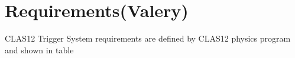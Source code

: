 \section{Requirements(Valery)}

CLAS12 Trigger System requirements are defined by CLAS12 physics program and shown in table\


